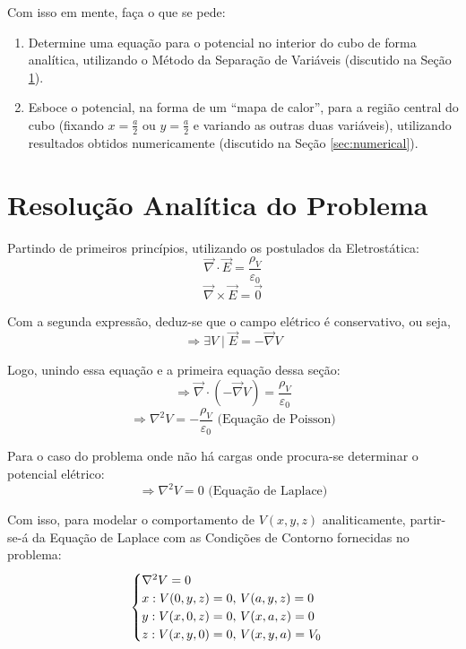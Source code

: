 \documentclass{report}
\let\oldsection\section
\renewcommand\section{\clearpage\oldsection}
\begin{document}
Com isso em mente, faça o que se pede:
\begin{enumerate}
    \item Determine uma equação para o potencial no interior do cubo de forma analítica, utilizando o Método da Separação de Variáveis
    (discutido na Seção \ref{sec:analysis}).
    \item Esboce o potencial, na forma de um ``mapa de calor”, para a região central do cubo (fixando $ x = \frac{a}{2} $
    ou $ y = \frac{a}{2} $ e variando as outras duas variáveis), utilizando resultados obtidos numericamente (discutido na Seção
    \ref{sec:numerical}).
\end{enumerate}

\section{Resolução Analítica do Problema}
\label{sec:analysis}

Partindo de primeiros princípios, utilizando os postulados da Eletrostática:
$$ \overrightarrow{\nabla}\cdot \overrightarrow{E} = \frac{\rho_V}{\varepsilon_0} $$
$$ \overrightarrow{\nabla}\times \overrightarrow{E} = \overrightarrow{0} $$

Com a segunda expressão, deduz-se que o campo elétrico é conservativo, ou seja,
$$ \Rightarrow \exists V \mid \overrightarrow{E} = -\overrightarrow{\nabla} V $$

Logo, unindo essa equação e a primeira equação dessa seção:
$$ \Rightarrow \overrightarrow{\nabla}\cdot(-\overrightarrow{\nabla} V) = \frac{\rho_V}{\varepsilon_0} $$
$$ \Rightarrow \nabla^2V = -\frac{\rho_V}{\varepsilon_0} \text{ (Equação de Poisson)} $$

Para o caso do problema onde não há cargas onde procura-se determinar o potencial elétrico:
$$ \Rightarrow \nabla^2V = 0 \text{ (Equação de Laplace)} $$

Com isso, para modelar o comportamento de $ V(x, y, z) $ analiticamente, partir-se-á da Equação
de Laplace com as Condições de Contorno fornecidas no problema:
\begin{equation}
  \label{eq:laplace}
  \centering
  \begin{cases}
    \nabla^2 V = 0 \\
    x: V(0, y, z) = 0,\, V(a, y, z) = 0 \\
    y: V(x, 0, z) = 0,\, V(x, a, z) = 0 \\
    z: V(x, y, 0) = 0,\, V(x, y, a) = V_0
  \end{cases}
\end{equation}
\end{document}
